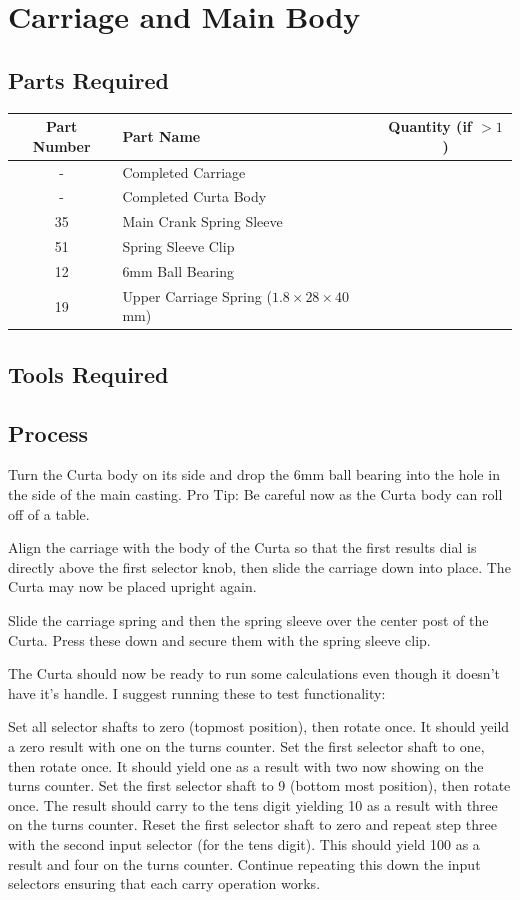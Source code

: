 \documentclass[openany]{book}
\begin{document}
\chapter{Carriage and Main Body}
\section{Parts Required}

\begin{table}[!ht]
	\centering
	\begin{tabular}{clc}
		Part Number & Part Name & Quantity (if $>1$) \\ \hline
		 - & Completed Carriage & \\
		 - & Completed Curta Body & \\
		 35 & Main Crank Spring Sleeve & \\
		 51 & Spring Sleeve Clip & \\ \hline \hline
 		 12 & 6mm Ball Bearing & \\
		 19 & Upper Carriage Spring ($1.8\times28\times40$mm) & 
	\end{tabular}
\end{table}


\section{Tools Required}

\section{Process}
Turn the Curta body on its side and drop the 6mm ball bearing into the hole in the side of the main casting. Pro Tip: Be careful now as the Curta body can roll off of a table.

Align the carriage with the body of the Curta so that the first results dial is directly above the first selector knob, then slide the carriage down into place. The Curta may now be placed upright again.

Slide the carriage spring and then the spring sleeve over the center post of the Curta. Press these down and secure them with the spring sleeve clip.

The Curta should now be ready to run some calculations even though it doesn't have it's handle. I suggest running these to test functionality:

Set all selector shafts to zero (topmost position), then rotate once. It should yeild a zero result with one on the turns counter.
Set the first selector shaft to one, then rotate once. It should yield one as a result with two now showing on the turns counter.
Set the first selector shaft to 9 (bottom most position), then rotate once. The result should carry to the tens digit yielding 10 as a result with three on the turns counter.
Reset the first selector shaft to zero and repeat step three with the second input selector (for the tens digit). This should yield 100 as a result and four on the turns counter.
Continue repeating this down the input selectors ensuring that each carry operation works.
\end{document}
